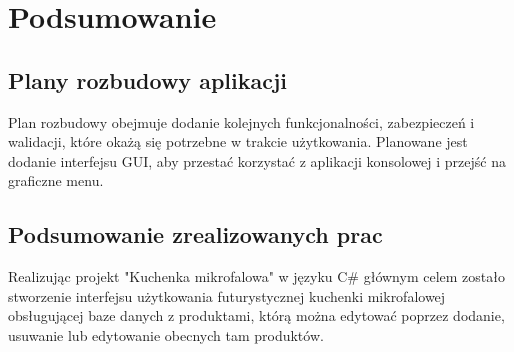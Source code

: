 \chapter{Podsumowanie}

\section{Plany rozbudowy aplikacji}

Plan rozbudowy obejmuje dodanie kolejnych funkcjonalności, zabezpieczeń i walidacji, które okażą się potrzebne w trakcie użytkowania. Planowane jest dodanie interfejsu GUI, aby przestać korzystać z aplikacji konsolowej i przejść na graficzne menu.

\section{Podsumowanie zrealizowanych prac}

Realizując projekt "Kuchenka mikrofalowa" w języku C\# głównym celem zostało stworzenie interfejsu użytkowania futurystycznej kuchenki mikrofalowej obsługującej baze danych z produktami, którą można edytować poprzez dodanie, usuwanie lub edytowanie obecnych tam produktów. 